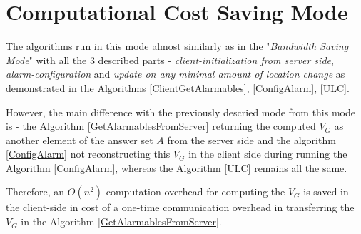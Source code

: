 \section{Computational Cost Saving Mode}
\label{CCS}
The algorithms run in this mode almost similarly as in the "\textit{Bandwidth Saving Mode}" with all the 3 described parts - \textit{client-initialization from server side}, \textit{alarm-configuration} and \textit{update on any minimal amount of location change} as demonstrated in the Algorithms \ref{ClientGetAlarmables}, \ref{ConfigAlarm}, \ref{ULC}.

However, the main difference with the previously descried mode from this mode is - the Algorithm \ref{GetAlarmablesFromServer} returning the computed $V_G$ as another element of the answer set $A$ from the server side and the algorithm \ref{ConfigAlarm} not reconstructing this $V_G$ in the client side during running the Algorithm \ref{ConfigAlarm}, whereas the Algorithm \ref{ULC} remains all the same.

Therefore, an $O(n^2)$ computation overhead for computing the $V_G$ is saved in the client-side in cost of a one-time communication overhead in transferring the $V_G$ in the Algorithm \ref{GetAlarmablesFromServer}.\\


















